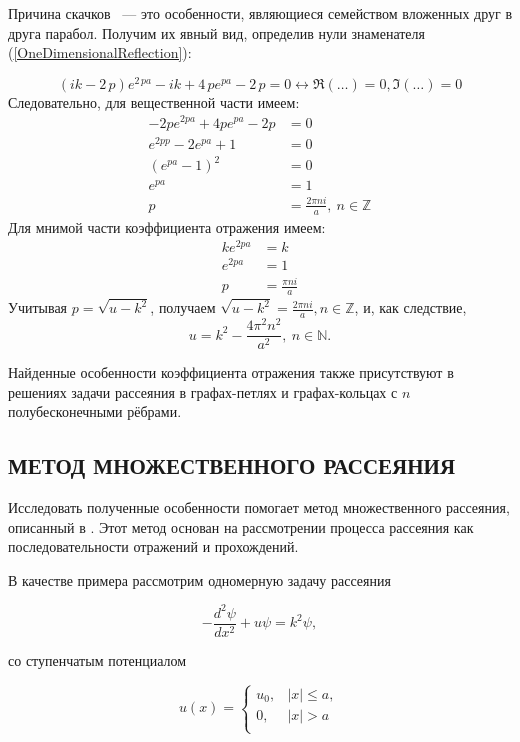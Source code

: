 \documentclass[a4 paper, 12 pt]{extarticle}
\begin{document}
   Причина скачков ~--- это особенности, являющиеся семейством вложенных друг в друга парабол. Получим их явный вид, определив нули знаменателя (\ref{OneDimensionalReflection}):
   
   \[\left( ik-2\,p \right) {e}^{2\,pa}-ik+4\,p{e}^{pa}-2\,p = 0 \longleftrightarrow \Re\left(\ldots\right) = 0, \Im\left(\ldots\right) = 0\]
   Следовательно, для вещественной части имеем:
   \begin{align*}
   -2pe^{2pa}+4pe^{pa}-2p &= 0 \\ e^{2pp} - 2e^{pa}+1 &= 0 \\
   \left(e^{pa}-1\right)^2 &= 0 \\
   e^{pa} &= 1 \\
   p &= \frac{2\pi n i}{a}, \ n \in \mathbb{Z}
   \end{align*}
   Для мнимой части коэффициента отражения имеем:
   \begin{align*}
   ke^{2pa} &=k \\
   e^{2pa} &= 1 \\
   p &= \frac{\pi n i}{a}
   \end{align*}
   Учитывая $p = \sqrt{u-k^2}$, получаем $\sqrt{u-k^2} = \frac{2\pi n i}{a}, n \in \mathbb{Z}$, и, как следствие,
   \[u = k^2 - \frac{4 \pi^2 n^2}{a^2}, \ n \in \mathbb{N}.
   \]
   
   Найденные особенности коэффициента отражения также присутствуют в решениях задачи рассеяния в графах-петлях и графах-кольцах с $n$ полубесконечными рёбрами.
   
   \subsection{МЕТОД МНОЖЕСТВЕННОГО РАССЕЯНИЯ}
   Исследовать полученные особенности помогает метод множественного рассеяния, описанный в \cite{Beam}. Этот метод основан на рассмотрении процесса рассеяния как последовательности отражений и прохождений.

   В качестве примера рассмотрим одномерную задачу рассеяния

   \begin{equation}\label{ScattPrBarr}
   -\frac{d^2\psi}{d x^2}+u\psi=k^2\psi,
   \end{equation}

   со ступенчатым потенциалом

   \begin{equation*}\label{BarrierPot}
   u(x)=\left\{%
   \begin{array}{ll}
   u_0, & |x|\leq a, \\
   0, & |x|>a \\
   \end{array}%
   \right.
   \end{equation*}
\end{document}
